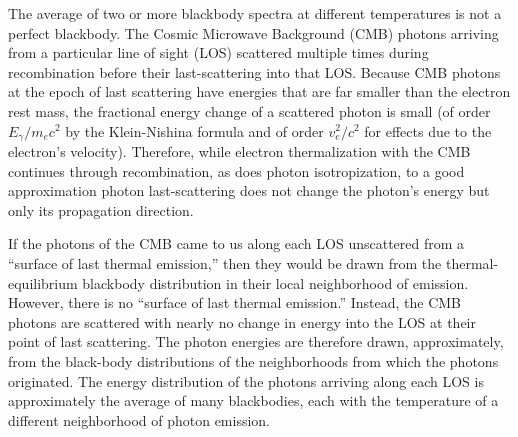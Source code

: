 \documentclass[fleqn,usenatbib]{mnras}
\begin{document}
    The average of two or more blackbody spectra at different temperatures is
    not a perfect blackbody.  The Cosmic Microwave Background (CMB) photons
    arriving from a particular line of sight (LOS) scattered multiple times
    during recombination before their last-scattering into that LOS.  Because
    CMB photons at the epoch of last scattering have energies that are far
    smaller than the electron rest mass, the fractional energy change of a
    scattered photon is small (of order $E_\gamma / m_e c^2$ by the
    Klein-Nishina formula \citep[as translated in
    \cite{KleinNishina1994}]{KleinNishina1929} and of order $v_e^2/c^2$ for
    effects due to the electron's velocity).  Therefore, while electron
    thermalization with the CMB continues through recombination, as does photon
    isotropization, to a good approximation photon last-scattering does not
    change the photon's energy but only its propagation direction.

    If the photons of the CMB came to us along each LOS unscattered from a
    ``surface of last thermal emission,'' then they would be drawn from the
    thermal-equilibrium blackbody distribution in their local neighborhood of
    emission. However, there is no ``surface of last thermal emission.''  
    Instead, the CMB photons are scattered with nearly no change in energy into
    the LOS at their point of last scattering.  The photon energies are
    therefore drawn, approximately, from the black-body distributions of the
    neighborhoods from which the photons originated.  The energy distribution of
    the photons arriving along each LOS is approximately the average of many
    blackbodies, each with the temperature of a different neighborhood of photon
    emission.
\end{document}
